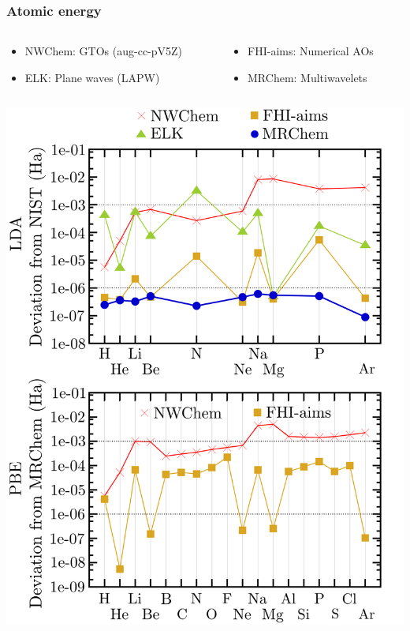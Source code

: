 \begin{frame}
    \frametitle{Atomic energy}
    \begin{columns}
    \begin{column}[b]{0.50\linewidth}
        \begin{itemize}
            \item NWChem: GTOs (aug-cc-pV5Z)
            \item ELK: Plane waves (LAPW)
        \end{itemize}
    \end{column}
    \begin{column}[b]{0.50\linewidth}
        \begin{itemize}
            \item FHI-aims: Numerical AOs
            \item MRChem: Multiwavelets
        \end{itemize}
    \end{column}
    \end{columns}
    \begin{center}
	\includegraphics[scale=0.18, clip, viewport = 0 820 1400 1720]{figures/atom_accuracy.png}
    \end{center}
\end{frame}


